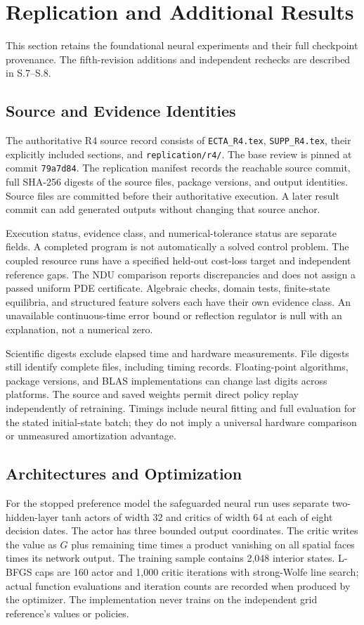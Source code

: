 \section{Replication and Additional Results}
This section retains the foundational neural experiments and their full checkpoint provenance. The fifth-revision additions and independent rechecks are described in S.7--S.8.

\subsection{Source and Evidence Identities}
The authoritative R4 source record consists of \texttt{ECTA\_R4.tex}, \texttt{SUPP\_R4.tex}, their explicitly included sections, and \texttt{replication/r4/}. The base review is pinned at commit \texttt{79a7d84}. The replication manifest records the reachable source commit, full SHA-256 digests of the source files, package versions, and output identities. Source files are committed before their authoritative execution. A later result commit can add generated outputs without changing that source anchor.

Execution status, evidence class, and numerical-tolerance status are separate fields. A completed program is not automatically a solved control problem. The coupled resource runs have a specified held-out cost-loss target and independent reference gaps. The NDU comparison reports discrepancies and does not assign a passed uniform PDE certificate. Algebraic checks, domain tests, finite-state equilibria, and structured feature solvers each have their own evidence class. An unavailable continuous-time error bound or reflection regulator is null with an explanation, not a numerical zero.

Scientific digests exclude elapsed time and hardware measurements. File digests still identify complete files, including timing records. Floating-point algorithms, package versions, and BLAS implementations can change last digits across platforms. The source and saved weights permit direct policy replay independently of retraining. Timings include neural fitting and full evaluation for the stated initial-state batch; they do not imply a universal hardware comparison or unmeasured amortization advantage.

\subsection{Architectures and Optimization}
For the stopped preference model the safeguarded neural run uses separate two-hidden-layer tanh actors of width 32 and critics of width 64 at each of eight decision dates. The actor has three bounded output coordinates. The critic writes the value as $G$ plus remaining time times a product vanishing on all spatial faces times its network output. The training sample contains 2,048 interior states. L-BFGS caps are 160 actor and 1,000 critic iterations with strong-Wolfe line search; actual function evaluations and iteration counts are recorded when produced by the optimizer. The implementation never trains on the independent grid reference's values or policies.

